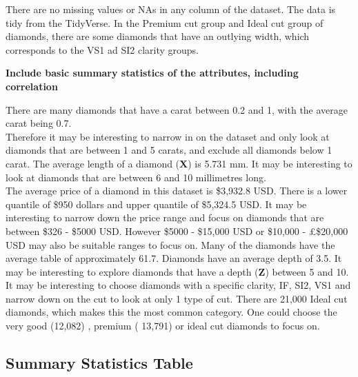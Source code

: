 \documentclass[
]{article}
\begin{document}
There are no missing values or NAs in any column of the dataset. The
data is tidy from the TidyVerse. In the Premium cut group and Ideal cut
group of diamonds, there are some diamonds that have an outlying width,
which corresponds to the VS1 ad SI2 clarity groups.

\textbf{Include basic summary statistics of the attributes, including
correlation}

There are many diamonds that have a carat between 0.2 and 1, with the
average carat being 0.7.\\
Therefore it may be interesting to narrow in on the dataset and only
look at diamonds that are between 1 and 5 carats, and exclude all
diamonds below 1 carat. The average length of a diamond (\textbf{X}) is
5.731 mm. It may be interesting to look at diamonds that are between 6
and 10 millimetres long.\\
The average price of a diamond in this dataset is \$3,932.8 USD. There
is a lower quantile of \$950 dollars and upper quantile of \$5,324.5
USD. It may be interesting to narrow down the price range and focus on
diamonds that are between \$326 - \$5000 USD. However \$5000 - \$15,000
USD or \$10,000 - £\$20,000 USD may also be suitable ranges to focus on.
Many of the diamonds have the average table of approximately 61.7.
Diamonds have an average depth of 3.5. It may be interesting to explore
diamonds that have a depth (\textbf{Z}) between 5 and 10. It may be
interesting to choose diamonds with a specific clarity, IF, SI2, VS1 and
narrow down on the cut to look at only 1 type of cut. There are 21,000
Ideal cut diamonds, which makes this the most common category. One could
choose the very good (12,082) , premium ( 13,791) or ideal cut diamonds
to focus on.

\subsection{Summary Statistics Table}\label{summary-statistics-table}
\end{document}
